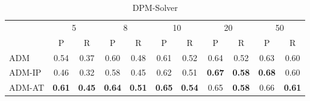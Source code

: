 \begin{table}[!t]
\begin{subtable}[h]{\textwidth}
{\begin{tabular}{l c c c c c c c c c c}
        \toprule
         & \multicolumn{2}{c}{5} & \multicolumn{2}{c}{8} & \multicolumn{2}{c}{10} & \multicolumn{2}{c}{20} & \multicolumn{2}{c}{50} \\
         & P & R & P & R & P & R & P & R & P & R\\
        \midrule
         ADM & 0.54 & 0.37 & 0.60 & 0.48 & 0.61 & 0.52 & 0.64 & 0.52 & 0.63 & 0.60 \\
         ADM-IP & 0.46 & 0.32 & 0.58 & 0.45 & 0.62 & 0.51 & \bf 0.67 & \bf 0.58 & \bf 0.68 & 0.60 \\
         ADM-AT & \bf 0.61 & \bf 0.45 & \bf 0.64 & \bf 0.51 & \bf 0.65 & \bf 0.54 & 0.65 & \bf 0.58 & 0.66 & \bf 0.61 \\
        \bottomrule
       \end{tabular}
       }
    \end{subtable}
    \hfill
    \begin{subtable}[h]{\textwidth}
        \centering
        \caption{DPM-Solver}
    \end{subtable}
    \label{tab:pr_c10}
\end{table}